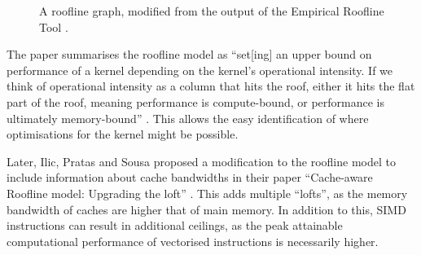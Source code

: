 \begin{figure}[H]
    \centering
    \caption{A roofline graph, modified from the output of the Empirical Roofline Tool \cite{EmpiricalRooflineTool}.}
    \label{fig:ert-roofline}
\end{figure}

The paper summarises the roofline model as ``set[ing] an upper bound on performance of a kernel depending on the kernel’s operational intensity. If we think of operational intensity as a column that hits the roof, either it hits the flat part of the roof, meaning performance is compute-bound, or performance is ultimately memory-bound'' \cite{williamsRooflineInsightfulVisual2009}. This allows the easy identification of where optimisations for the kernel might be possible.

Later, Ilic, Pratas and Sousa proposed a modification to the roofline model to include information about cache bandwidths in their paper ``Cache-aware Roofline model: Upgrading the loft'' \cite{ilic_cache-aware_2014}. This adds multiple ``lofts'', as the memory bandwidth of caches are higher that of main memory. In addition to this, SIMD instructions can result in additional ceilings, as the peak attainable computational performance of vectorised instructions is necessarily higher.

